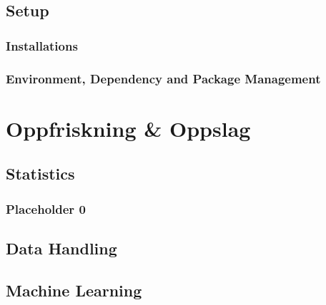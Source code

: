 \documentclass[letterpaper,10pt,english]{jupyterBook}
\begin{document}
\chapter{Setup}
\label{\detokenize{src/intro/setup:setup}}\label{\detokenize{src/intro/setup::doc}}
\sphinxstepscope


\section{Installations}
\label{\detokenize{src/intro/install:installations}}\label{\detokenize{src/intro/install::doc}}
\sphinxstepscope


\section{Environment, Dependency and Package Management}
\label{\detokenize{src/intro/devman:environment-dependency-and-package-management}}\label{\detokenize{src/intro/devman::doc}}
\sphinxstepscope


\part{Oppfriskning \& Oppslag}

\sphinxstepscope


\chapter{Statistics}
\label{\detokenize{src/opp/stats:statistics}}\label{\detokenize{src/opp/stats::doc}}
\sphinxstepscope


\section{Placeholder 0}
\label{\detokenize{src/opp/ph0:placeholder-0}}\label{\detokenize{src/opp/ph0::doc}}
\sphinxstepscope


\chapter{Data Handling}
\label{\detokenize{src/opp/data:data-handling}}\label{\detokenize{src/opp/data::doc}}
\sphinxstepscope


\chapter{Machine Learning}
\label{\detokenize{src/opp/ml:machine-learning}}\label{\detokenize{src/opp/ml::doc}}
\sphinxstepscope
\end{document}
